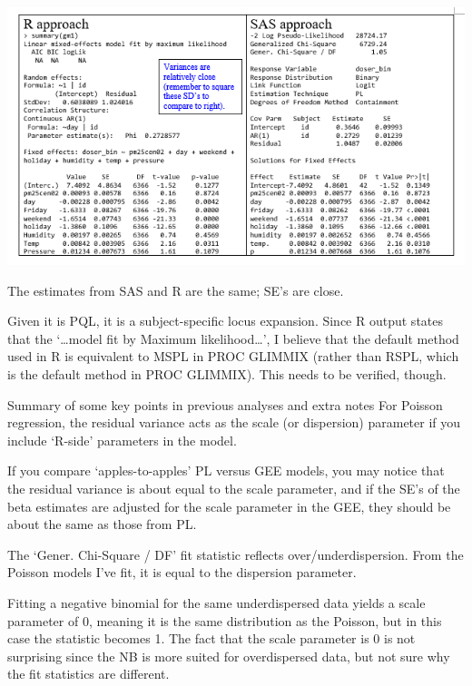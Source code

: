\documentclass[
  9pt,
  ignorenonframetext,
]{beamer}
\begin{document}
\begin{frame}{}
\protect\hypertarget{section-9}{}
\begin{center}\includegraphics[width=0.7\linewidth]{figs_L16/f8} \end{center}

The estimates from SAS and R are the same; SE's are close.

Given it is PQL, it is a subject-specific locus expansion. Since R
output states that the `\ldots model fit by Maximum likelihood\ldots{}',
I believe that the default method used in R is equivalent to MSPL in
PROC GLIMMIX (rather than RSPL, which is the default method in PROC
GLIMMIX). This needs to be verified, though.
\end{frame}

\begin{frame}{Summary of some key points in previous analyses and extra
notes}
\protect\hypertarget{summary-of-some-key-points-in-previous-analyses-and-extra-notes}{}
For Poisson regression, the residual variance acts as the scale (or
dispersion) parameter if you include `R-side' parameters in the model.

If you compare `apples-to-apples' PL versus GEE models, you may notice
that the residual variance is about equal to the scale parameter, and if
the SE's of the beta estimates are adjusted for the scale parameter in
the GEE, they should be about the same as those from PL.

The `Gener. Chi-Square / DF' fit statistic reflects
over/underdispersion. From the Poisson models I've fit, it is equal to
the dispersion parameter.

Fitting a negative binomial for the same underdispersed data yields a
scale parameter of 0, meaning it is the same distribution as the
Poisson, but in this case the statistic becomes 1. The fact that the
scale parameter is 0 is not surprising since the NB is more suited for
overdispersed data, but not sure why the fit statistics are different.
\end{frame}
\end{document}
